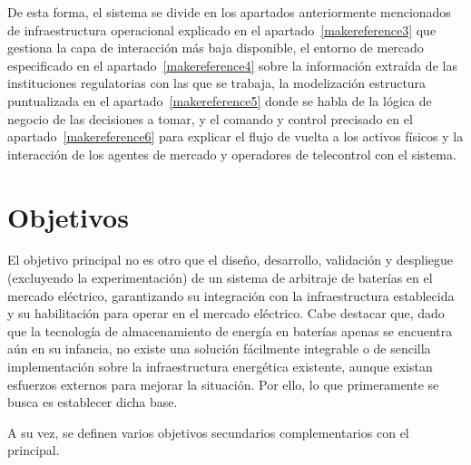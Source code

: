 De esta forma, el sistema se divide en los apartados anteriormente mencionados de infraestructura operacional explicado en el apartado~\ref{makereference3} que gestiona la capa de interacción más baja disponible, el entorno de mercado especificado en el apartado~\ref{makereference4} sobre la información extraída de las instituciones regulatorias con las que se trabaja, la modelización estructura puntualizada en el apartado~\ref{makereference5} donde se habla de la lógica de negocio de las decisiones a tomar, y el comando y control precisado en el apartado~\ref{makereference6} para explicar el flujo de vuelta a los activos físicos y la interacción de los agentes de mercado y operadores de telecontrol con el sistema.

\section{Objetivos}
\label{makereference1.1}

El objetivo principal no es otro que el diseño, desarrollo, validación y despliegue (excluyendo la experimentación) de un sistema de arbitraje de baterías en el mercado eléctrico, garantizando su integración con la infraestructura establecida y su habilitación para operar en el mercado eléctrico. Cabe destacar que, dado que la tecnología de almacenamiento de energía en baterías apenas se encuentra aún en su infancia, no existe una solución fácilmente integrable o de sencilla implementación sobre la infraestructura energética existente, aunque existan esfuerzos externos para mejorar la situación. Por ello, lo que primeramente se busca es establecer dicha base.

A su vez, se definen varios objetivos secundarios complementarios con el principal.

